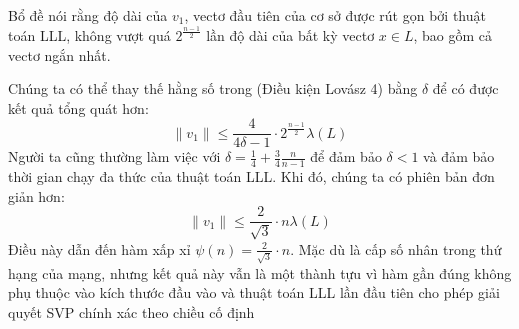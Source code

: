 \documentclass{article}
\begin{document}
Bổ đề nói rằng độ dài của $v_1$, vectơ đầu tiên của cơ sở được rút gọn bởi thuật toán LLL, không vượt quá $2^{\frac{n-1}{2}}$ lần độ dài của bất kỳ vectơ $x \in L$, bao gồm cả vectơ ngắn nhất.

Chúng ta có thể thay thế hằng số trong (Điều kiện Lovász 4) bằng $\delta$ để có được kết quả tổng quát hơn:
\[
\|v_1\| \leq \frac{4}{4\delta-1} \cdot 2^{\frac{n-1}{2}} \lambda(L)
\]
Người ta cũng thường làm việc với $\delta = \frac{1}{4} + \frac{3}{4}\frac{n}{n-1}$ để đảm bảo $\delta < 1$ và đảm bảo thời gian chạy đa thức của thuật toán LLL. Khi đó, chúng ta có phiên bản đơn giản hơn:
\[
\|v_1\| \leq \frac{2}{\sqrt{3}} \cdot n \lambda(L)
\]
Điều này dẫn đến hàm xấp xỉ $\psi(n) = \frac{2}{\sqrt{3}} \cdot n$. Mặc dù là cấp số nhân trong thứ hạng của mạng, nhưng kết quả này vẫn là một thành tựu vì hàm gần đúng không phụ thuộc vào kích thước đầu vào và thuật toán LLL lần đầu tiên cho phép giải quyết SVP chính xác theo chiều cố định

\end{document}
